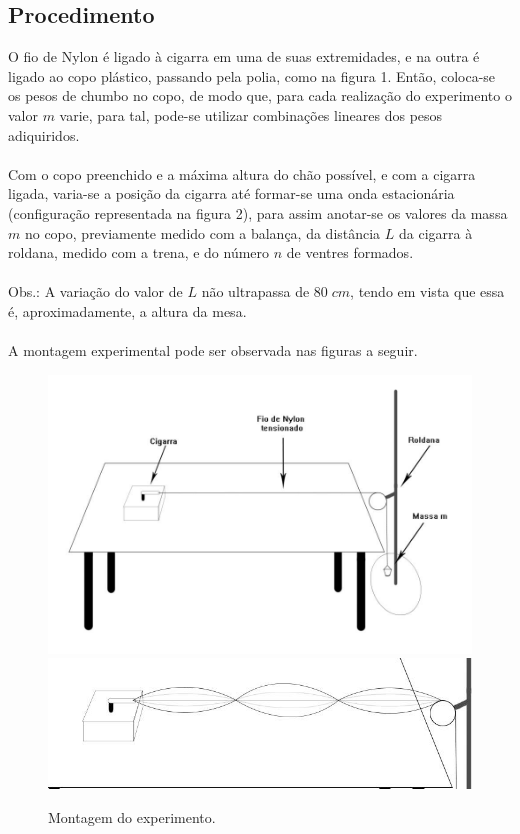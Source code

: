 \documentclass[12pt,a4paper]{article}
\begin{document}
\subsection{Procedimento}
O fio de Nylon é ligado à cigarra em uma de suas extremidades, e na outra é ligado ao copo plástico, passando pela polia, como na figura 1. Então, coloca-se os pesos de chumbo no copo, de modo que, para cada realização do experimento o valor $m$ varie, para tal, pode-se utilizar combinações lineares dos pesos adiquiridos. \\\\
Com o copo preenchido e a máxima altura do chão possível, e com a cigarra ligada, varia-se a posição da cigarra até formar-se uma onda estacionária (configuração representada na figura 2), para assim anotar-se os valores da massa $m$ no copo, previamente medido com a balança, da distância $L$ da cigarra à roldana, medido com a trena, e do número $n$ de ventres formados. \\\\
Obs.: A variação do valor de $L$ não ultrapassa de $80 \; cm$, tendo em vista que essa é, aproximadamente, a altura da mesa.\\\\
A montagem experimental pode ser observada nas figuras a seguir.
\begin{figure}[!htbp]
\includegraphics[scale=0.2]{img1.jpg}
\includegraphics[scale=0.3]{img2.jpg}
\caption{Montagem do experimento.}
\end{figure}
\end{document}
